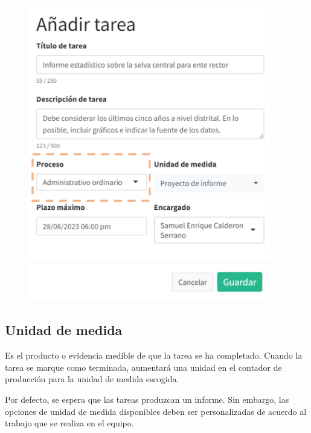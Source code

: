 \documentclass[
  letterpaper,
  DIV=11,
  numbers=noendperiod]{scrreprt}
\begin{document}
\begin{figure}

{\centering \includegraphics[width=4.16667in,height=\textheight]{./img/manual-user/new-task-process.png}

}

\end{figure}

\hypertarget{sec-unidad-de-medida}{%
\subsection{Unidad de medida}\label{sec-unidad-de-medida}}

Es el producto o evidencia medible de que la tarea se ha completado.
Cuando la tarea se marque como terminada, aumentará una unidad en el
contador de producción para la unidad de medida escogida.

Por defecto, se espera que las tareas produzcan un informe. Sin embargo,
las opciones de unidad de medida disponibles deben ser personalizadas de
acuerdo al trabajo que se realiza en el equipo.
\end{document}
